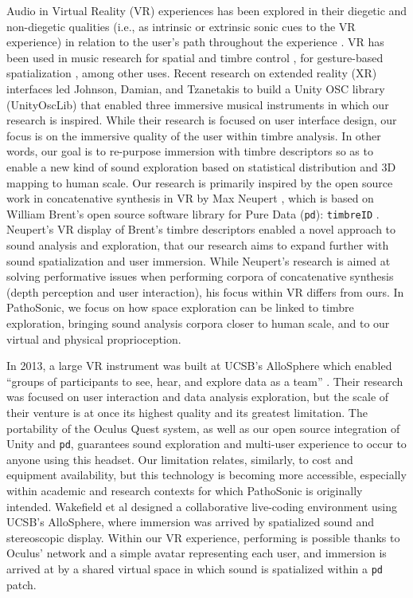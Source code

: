 \documentclass{nime-alternate}
\begin{document}
Audio in Virtual Reality (VR) experiences has been explored in their diegetic and non-diegetic qualities (i.e., as intrinsic or extrinsic sonic cues to the VR experience) in relation to the user's path throughout the experience \cite{anil_camci_2019_3249315}. VR has been used in music research for spatial and timbre control \cite{rgraham2017}, for gesture-based spatialization \cite{giovanni_santini_2019_3249329}, among other uses. Recent research on extended reality (XR) interfaces led Johnson, Damian, and Tzanetakis \cite{david_johnson_2019_3249319} to build a Unity OSC library (UnityOscLib) that enabled three immersive musical instruments in which our research is inspired. While their research is focused on user interface design, our focus is on the immersive quality of the user within timbre analysis. In other words, our goal is to re-purpose immersion with timbre descriptors so as to enable a new kind of sound exploration based on statistical distribution and 3D mapping to human scale. Our research is primarily inspired by the open source work in concatenative synthesis in VR by Max Neupert \cite{neupert2017}, which is based on William Brent's open source software library for Pure Data (\texttt{pd}): \texttt{timbreID} \cite{icmc/bbp2372.2010.044}. Neupert's VR display of Brent’s timbre descriptors enabled a novel approach to sound analysis and exploration, that our research aims to expand further with sound spatialization and user immersion. While Neupert's research is aimed at solving performative issues when performing corpora of concatenative synthesis (depth perception and user interaction), his focus within VR differs from ours. In PathoSonic, we focus on how space exploration can be linked to timbre exploration, bringing sound analysis corpora closer to human scale, and to our virtual and physical proprioception. 

In 2013, a large VR instrument was built at UCSB's AlloSphere which enabled ``groups of participants to see, hear, and explore data as a team'' \cite{KUCHERAMORIN201410}. Their research was focused on user interaction and data analysis exploration, but the scale of their venture is at once its highest quality and its greatest limitation. The portability of the Oculus Quest system, as well as our open source integration of Unity and \texttt{pd}, guarantees sound exploration and multi-user experience to occur to anyone using this headset. Our limitation relates, similarly, to cost and equipment availability, but this technology is becoming more accessible, especially within academic and research contexts for which PathoSonic is originally intended. Wakefield et al \cite{gwakefield2014} designed a collaborative live-coding environment using UCSB's AlloSphere, where immersion was arrived by spatialized sound and stereoscopic display. Within our VR experience, performing is possible thanks to Oculus' network and a simple avatar representing each user, and immersion is arrived at by a shared virtual space in which sound is spatialized within a \texttt{pd} patch. 
\end{document}
